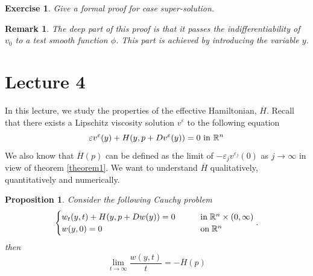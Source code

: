 \documentclass[12pt, oneside]{amsart}  	%
\newtheorem{remark}{Remark}
\newtheorem{proposition}{Proposition}
\newtheorem{exercise}{Exercise}
\begin{document}
\begin{exercise}\label{exercise3} Give a formal proof for case super-solution.
\end{exercise}


\begin{remark}
The deep part of this proof is that it passes the indifferentiability of $v_0$ to a test smooth function $\phi$. This part is achieved by introducing the variable $y$.
\end{remark}

\newpage

\section*{{\LARGE Lecture 4}}
\vspace*{0.5cm}



In this lecture, we study the properties of the effective Hamiltonian, $\overline{H}$. Recall that there exists a Lipschitz viscosity solution $v^\varepsilon$ to the following equation 
\begin{equation*}
\varepsilon v^\varepsilon(y) + H(y, p+Dv^\varepsilon(y))=0 \text{ in } \mathbb{R}^n
\end{equation*}
We also know that $\overline{H}(p)$ can be defined as the limit of $-\varepsilon_j v^{\varepsilon_j}(0)$ as $j\longrightarrow \infty$ in view of theorem \ref{theorem1}. We want to understand $\overline{H}$ qualitatively, quantitatively and numerically.
\begin{proposition}\label{H bar as the limit large time} Consider the following Cauchy problem 
\begin{equation*}
	\begin{cases}
		w_t(y,t) + H(y, p + Dw(y))=0 \qquad&\text{in}\; \mathbb{R}^n\times (0,\infty)\\
		w(y,0) = 0 \qquad&\text{on}\;\mathbb{R}^n
	\end{cases}.
\end{equation*}
then
	$$\lim_{t\to\infty} \frac{w(y,t)}{t}=-\overline{H}(p)$$
\end{proposition}
\end{document}
